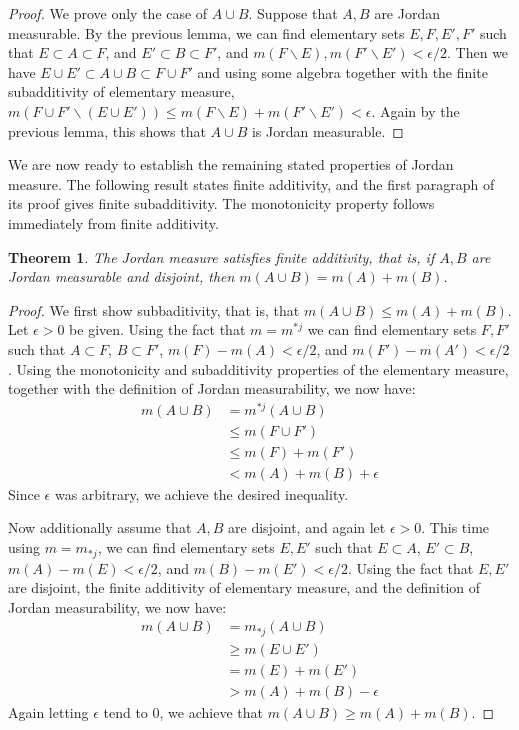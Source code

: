 \documentclass[11pt,oneside]{amsbook}
\renewcommand{\setminus}{\smallsetminus}
\theoremstyle{definition}
\theoremstyle{plain}
\newtheorem{thm}{Theorem}[section]
\theoremstyle{definition}
\theoremstyle{remark}
\numberwithin{equation}{section}
\numberwithin{figure}{section}
\begin{document}
\begin{proof}
  We prove only the case of $A\cup B$. Suppose that $A,B$ are Jordan measurable. By the previous lemma, we can find elementary sets $E,F,E',F'$ such that $E\subset A\subset F$, and $E'\subset B\subset F'$, and $m(F\setminus E),m(F'\setminus E')<\epsilon/2$. Then we have $E\cup E'\subset A\cup B\subset F\cup F'$ and using some algebra together with the finite subadditivity of elementary measure, $m(F\cup F'\setminus(E\cup E'))\leq m(F\setminus E)+m(F'\setminus E')<\epsilon$. Again by the previous lemma, this shows that $A\cup B$ is Jordan measurable.
\end{proof}

We are now ready to establish the remaining stated properties of Jordan measure. The following result states finite additivity, and the first paragraph of its proof gives finite subadditivity. The monotonicity property follows immediately from finite additivity.

\begin{thm}
  The Jordan measure satisfies finite additivity, that is, if $A,B$ are Jordan measurable and disjoint, then $m(A\cup B)=m(A)+m(B)$.
\end{thm}

\begin{proof}
  We first show subbaditivity, that is, that $m(A\cup B)\leq m(A)+m(B)$. Let $\epsilon>0$ be given. Using the fact that $m=m^{*j}$ we can find elementary sets $F,F'$ such that $A\subset F$, $B\subset F'$, $m(F)-m(A)<\epsilon/2$, and $m(F')-m(A')<\epsilon/2$. Using the monotonicity and subadditivity properties of the elementary measure, together with the definition of Jordan measurability, we now have:
  \begin{align*}
    m(A\cup B)&=m^{*j}(A\cup B)\\
              &\leq m(F\cup F')\\
              &\leq m(F)+m(F')\\
              &<m(A)+m(B)+\epsilon
  \end{align*}
  Since $\epsilon$ was arbitrary, we achieve the desired inequality.
  
  Now additionally assume that $A,B$ are disjoint, and again let $\epsilon>0$. This time using $m=m_{*j}$, we can find elementary sets $E,E'$ such that $E\subset A$, $E'\subset B$, $m(A)-m(E)<\epsilon/2$, and $m(B)-m(E')<\epsilon/2$. Using the fact that $E,E'$ are disjoint, the finite additivity of elementary measure, and the definition of Jordan measurability, we now have:
  \begin{align*}
    m(A\cup B)&=m_{*j}(A\cup B)\\
              &\geq m(E\cup E')\\
              &=m(E)+m(E')\\
              &>m(A)+m(B)-\epsilon
  \end{align*}
  Again letting $\epsilon$ tend to $0$, we achieve that $m(A\cup B)\geq m(A)+m(B)$.
\end{proof}
\end{document}
